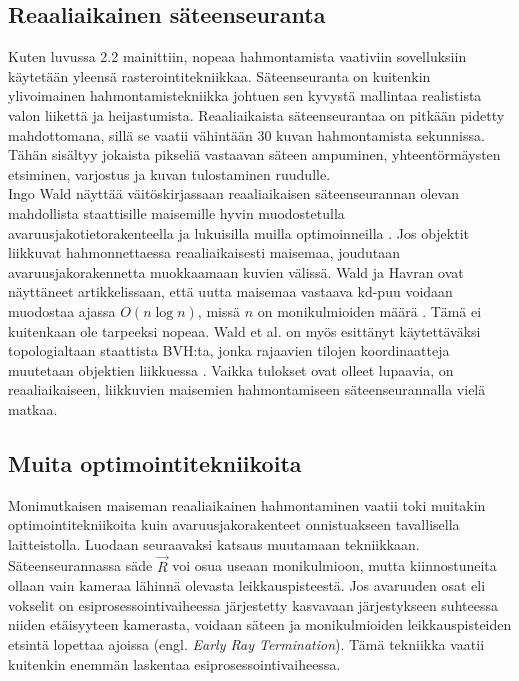 \documentclass[a4paper, 12pt, titlepage]{article}
\begin{document}
\subsection{Reaaliaikainen säteenseuranta}

Kuten luvussa 2.2 mainittiin, nopeaa hahmontamista vaativiin sovelluksiin käytetään yleensä rasterointitekniikkaa. Säteenseuranta on kuitenkin ylivoimainen hahmontamistekniikka johtuen sen kyvystä mallintaa realistista valon liikettä ja heijastumista. Reaaliaikaista säteenseurantaa on pitkään pidetty mahdottomana, sillä se vaatii vähintään 30 kuvan hahmontamista sekunnissa. Tähän sisältyy jokaista pikseliä vastaavan säteen ampuminen, yhteentörmäysten etsiminen, varjostus ja kuvan tulostaminen ruudulle. \\

Ingo Wald näyttää väitöskirjassaan reaaliaikaisen säteenseurannan olevan mahdollista staattisille maisemille hyvin muodostetulla avaruusjakotietorakenteella ja lukuisilla muilla optimoinneilla \citep{wald04}. Jos objektit liikkuvat hahmonnettaessa reaaliaikaisesti maisemaa, joudutaan avaruusjakorakennetta muokkaamaan kuvien välissä. Wald ja Havran ovat näyttäneet artikkelissaan, että uutta maisemaa vastaava kd-puu voidaan muodostaa ajassa $O(n \log n)$, missä $n$ on monikulmioiden määrä \citep{wald06}. Tämä ei kuitenkaan ole tarpeeksi nopeaa. Wald et al. on myös esittänyt käytettäväksi topologialtaan staattista BVH:ta, jonka rajaavien tilojen koordinaatteja muutetaan objektien liikkuessa \citep{wald}. Vaikka tulokset ovat olleet lupaavia, on reaaliaikaiseen, liikkuvien maisemien hahmontamiseen säteenseurannalla vielä matkaa. 

\subsection{Muita optimointitekniikoita}

Monimutkaisen maiseman reaaliaikainen hahmontaminen vaatii toki muitakin optimointitekniikoita kuin avaruusjakorakenteet onnistuakseen tavallisella laitteistolla. Luodaan seuraavaksi katsaus muutamaan tekniikkaan.\\

Säteenseurannassa säde $\vec{R}$ voi osua useaan monikulmioon, mutta kiinnostuneita ollaan vain kameraa lähinnä olevasta leikkauspisteestä. Jos avaruuden osat eli vokselit on esiprosessointivaiheessa järjestetty kasvavaan järjestykseen suhteessa niiden etäisyyteen kamerasta, voidaan säteen ja monikulmioiden leikkauspisteiden etsintä lopettaa ajoissa (engl. \emph{Early Ray Termination}). Tämä tekniikka vaatii kuitenkin enemmän laskentaa esiprosessointivaiheessa. \citep{wald04}\\
\end{document}
